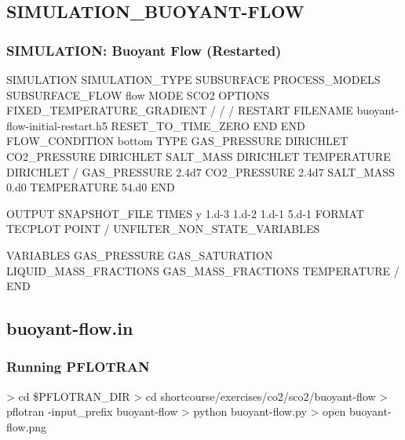 \documentclass{beamer}
\newcommand\redcomment[1]{{{\color{red} #1}}}
\begin{document}
\subsection{SIMULATION\_BUOYANT-FLOW}

\begin{frame}\frametitle{SIMULATION: Buoyant Flow (Restarted)}

\begin{semiverbatim}
SIMULATION
  SIMULATION_TYPE SUBSURFACE
  PROCESS_MODELS
    SUBSURFACE_FLOW flow
      MODE SCO2
      \redcomment{OPTIONS}
        \redcomment{FIXED_TEMPERATURE_GRADIENT}
      \redcomment{/}
    /
  /
\redcomment{  RESTART}
  \redcomment{  FILENAME buoyant-flow-initial-restart.h5}
  \redcomment{  RESET_TO_TIME_ZERO}
\redcomment{  END}
END
\newpage
\redcomment{FLOW_CONDITION bottom}
  \redcomment{TYPE}
    \redcomment{GAS_PRESSURE DIRICHLET}
    \redcomment{CO2_PRESSURE DIRICHLET}
    \redcomment{SALT_MASS DIRICHLET}
    \redcomment{TEMPERATURE DIRICHLET}
  \redcomment{/}
  \redcomment{GAS_PRESSURE 2.4d7}
  \redcomment{CO2_PRESSURE 2.4d7}
  \redcomment{SALT_MASS 0.d0}
  \redcomment{TEMPERATURE 54.d0}
\redcomment{END}

\newpage
\redcomment{OUTPUT}
  \redcomment{SNAPSHOT_FILE}
    \redcomment{TIMES y 1.d-3 1.d-2 1.d-1 5.d-1}
    \redcomment{FORMAT TECPLOT POINT}
  \redcomment{/}
  \redcomment{UNFILTER_NON_STATE_VARIABLES}

  \redcomment{VARIABLES}
   \redcomment{GAS_PRESSURE}
   \redcomment{GAS_SATURATION}
   \redcomment{LIQUID_MASS_FRACTIONS}
   \redcomment{GAS_MASS_FRACTIONS}
   \redcomment{TEMPERATURE}
  \redcomment{/}
\redcomment{END}
\end{semiverbatim}

\end{frame}
\subsection{buoyant-flow.in}

\begin{frame}[fragile]\frametitle{Running PFLOTRAN}

\begin{semiverbatim}

> cd \$PFLOTRAN_DIR
> cd shortcourse/exercises/co2/sco2/buoyant-flow
> pflotran -input_prefix buoyant-flow
> python buoyant-flow.py
> open buoyant-flow.png
\end{semiverbatim}

\end{frame}
\end{document}
